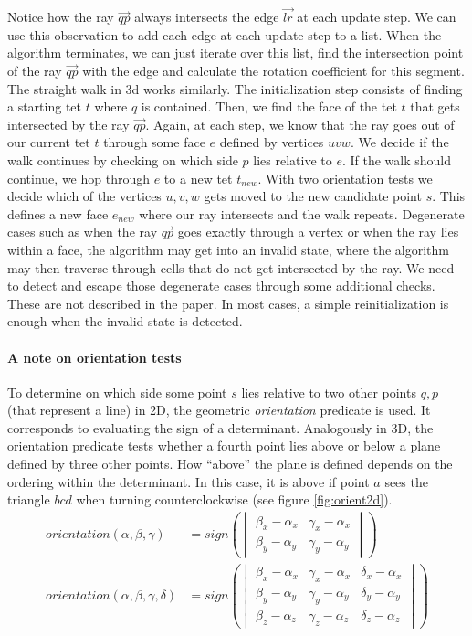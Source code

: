 \documentclass[../thesis.tex]{subfiles}
\begin{document}
Notice how the ray $\vec{qp}$ always intersects the edge $\vec{lr}$ at each update step.
We can use this observation to add each edge at each update step to a list.
When the algorithm terminates, we can just iterate over this list, find
the intersection point of the ray $\vec{qp}$ with the edge and calculate the rotation
coefficient for this segment.
The straight walk in 3d works similarly. The initialization step consists of finding a starting tet $t$
where $q$ is contained. Then, we find the face of the tet $t$ that gets intersected by the ray
$\vec{qp}$. Again, at each step, we know that the ray goes out of our current tet $t$ through some
face $e$ defined by vertices $uvw$. We decide if the walk continues by checking on which side $p$ lies relative to $e$.
If the walk should continue, we hop through $e$ to a new tet $t_{new}$. With two orientation tests
we decide which of the vertices $u, v, w$ gets moved to the new candidate point $s$. This defines
a new face $e_{new}$ where our ray intersects and the walk repeats.
Degenerate cases such as when the ray $\vec{qp}$ goes exactly through a vertex or
when the ray lies within a face, the algorithm may get into
an invalid state, where the algorithm may then traverse through
cells that do not get intersected by the ray. We need to detect and escape those degenerate cases
through some additional checks. These are not described in the paper\cite{Devillers}.
In most cases, a simple reinitialization is enough when the invalid state is detected.

\paragraph{A note on orientation tests}
To determine on which side some point $s$ lies relative to two other points $q,p$ (that represent a line) in 2D, the geometric \emph{orientation} predicate is used.
It corresponds to evaluating the sign of a determinant. Analogously in 3D, the orientation predicate
tests whether a fourth point lies above or below a plane defined by three other points.
How ``above'' the plane is defined depends on the ordering within the determinant. In this case,
it is above if point $a$ sees the triangle $bcd$ when turning counterclockwise (see figure \ref{fig:orient2d}).
\begin{align*}
  orientation(\alpha, \beta, \gamma) &= 
  sign\left(
  \begin{vmatrix}
    \beta_x -\alpha_x & \gamma_x - \alpha_x \\
    \beta_y -\alpha_y & \gamma_y - \alpha_y 
  \end{vmatrix}\right)
  \\
  orientation(\alpha, \beta, \gamma, \delta) &= 
  sign\left(
  \begin{vmatrix}
    \beta_x -\alpha_x & \gamma_x - \alpha_x & \delta_x - \alpha_x \\
    \beta_y -\alpha_y & \gamma_y - \alpha_y & \delta_y - \alpha_y \\
    \beta_z -\alpha_z & \gamma_z - \alpha_z & \delta_z - \alpha_z
  \end{vmatrix}\right)
\end{align*}
\end{document}
